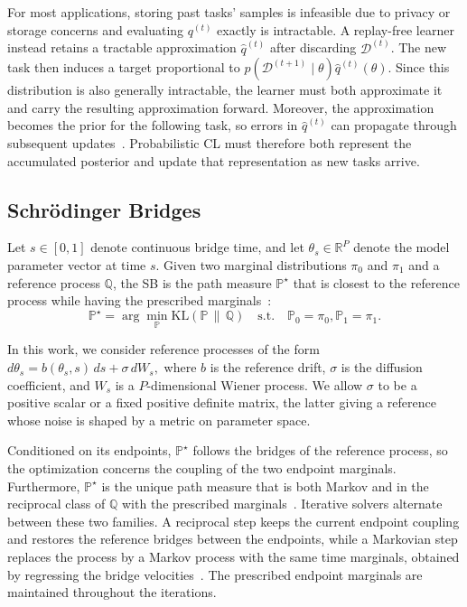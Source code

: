 \documentclass{article}
\begin{document}
For most applications, storing past tasks' samples is infeasible due to privacy or storage concerns and evaluating $q^{(t)}$ exactly is intractable. A replay-free learner instead retains a tractable approximation $\hat q^{(t)}$ after discarding $\mathcal{D}^{(t)}$. The new task then induces a target proportional to $p(\mathcal{D}^{(t+1)}\mid\theta)\hat q^{(t)}(\theta)$. Since this distribution is also generally intractable, the learner must both approximate it and carry the resulting approximation forward. Moreover, the
approximation becomes the prior for the following task, so errors in $\hat q^{(t)}$ can propagate through subsequent updates~\cite{kessler2023sequential}. Probabilistic CL must therefore both represent the accumulated posterior and update that representation as new tasks arrive.

\subsection{Schr\"odinger Bridges}

Let $s\in[0,1]$ denote continuous bridge time, and let $\theta_s\in\mathbb{R}^P$ denote the model parameter vector at time $s$. Given two marginal distributions $\pi_0$ and $\pi_1$ and a reference process $\mathbb{Q}$, the SB is the path measure $\mathbb{P}^\star$ that is closest to the reference process while having the prescribed marginals~\cite{leonard2014survey}:
\begin{equation}
\mathbb{P}^\star
=
\arg\min_{\mathbb{P}}
\mathrm{KL}(\mathbb{P}\,\|\,\mathbb{Q})
\quad
\text{s.t.}
\quad
\mathbb{P}_0=\pi_0, 
\mathbb{P}_1=\pi_1.
\label{eq:sb}
\end{equation}

In this work, we consider reference processes of the form
$
    d\theta_s=b(\theta_s,s)\,ds+\sigma\,dW_s,
$
where $b$ is the reference drift, $\sigma$ is the diffusion coefficient, and
$W_s$ is a $P$-dimensional Wiener process. We allow $\sigma$ to be a positive
scalar or a fixed positive definite matrix, the latter giving a reference whose
noise is shaped by a metric on parameter space.

Conditioned on its endpoints, $\mathbb{P}^\star$ follows the bridges of the reference process, so the optimization concerns the coupling of the two endpoint marginals. Furthermore, $\mathbb{P}^\star$ is the unique path measure that is both Markov and in the reciprocal class of $\mathbb{Q}$ with the prescribed marginals~\cite{shi2023dsbm}. Iterative solvers alternate between these two families. A reciprocal step keeps the current endpoint coupling and restores the reference bridges between the endpoints, while a Markovian step replaces the process by a Markov process with the same time marginals, obtained by regressing the bridge velocities~\cite{debortoli2021dsb,shi2023dsbm,peluchetti2023idbm}. The prescribed endpoint marginals are maintained throughout the iterations.
\end{document}
